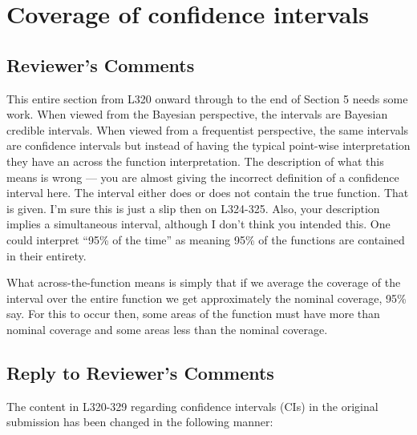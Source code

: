 \documentclass[
]{article}
\begin{document}
\hypertarget{coverage-of-confidence-intervals}{%
\section{Coverage of confidence intervals}\label{coverage-of-confidence-intervals}}

\hypertarget{reviewers-comments-7}{%
\subsection{Reviewer's Comments}\label{reviewers-comments-7}}

This entire section from L320 onward through to the end of Section 5 needs some work. When viewed from the Bayesian perspective, the intervals are Bayesian credible intervals. When viewed from a frequentist perspective, the same intervals are confidence intervals but instead of having the typical point-wise interpretation they have an across the function interpretation.
The description of what this means is wrong --- you are almost giving the incorrect definition of a confidence interval here. The interval either does or does not contain the true function. That is given. I'm sure this is just a slip then on L324-325.
Also, your description implies a simultaneous interval, although I don't think you intended this. One could interpret ``95\% of the time'' as meaning 95\% of the functions are contained in their entirety.

What across-the-function means is simply that if we average the coverage of the interval over the entire function we get approximately the nominal coverage, 95\% say. For this to occur then, some areas of the function must have more
than nominal coverage and some areas less than the nominal coverage.

\hypertarget{section-8}{%
\subsection{\texorpdfstring{\textcolor{reviewersblue} {Reply to Reviewer's Comments}}{}}\label{section-8}}

The content in L320-329 regarding confidence intervals (CIs) in the original submission has been changed in the following manner:
\end{document}
